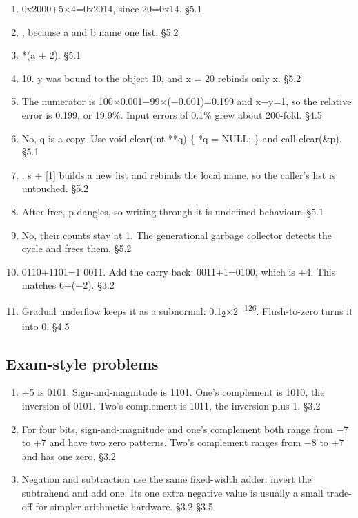 \documentclass[11pt]{article}
\begin{document}
\begin{keepsection}
\begin{enumerate}
\item 0x2000+5\ensuremath{\times}4=0x2014, since 20=0x14. \hfill{\small\color{FAUblue}§5.1}
\item [1, 2, 3], because a and b name one list. \hfill{\small\color{FAUblue}§5.2}
\item *(a + 2). \hfill{\small\color{FAUblue}§5.1}
\item 10. y was bound to the object 10, and x = 20 rebinds only x. \hfill{\small\color{FAUblue}§5.2}
\item The numerator is 100\ensuremath{\times}0.001\ensuremath{-}99\ensuremath{\times}(\ensuremath{-}0.001)=0.199 and x\ensuremath{-}y=1, so the relative error is 0.199, or 19.9\%. Input errors of 0.1\% grew about 200-fold. \hfill{\small\color{FAUblue}§4.5}
\item No, q is a copy. Use void clear(int **q) \{ *q = NULL; \} and call clear(\&p). \hfill{\small\color{FAUblue}§5.1}
\item [0]. s + [1] builds a new list and rebinds the local name, so the caller’s list is untouched. \hfill{\small\color{FAUblue}§5.2}
\item After free, p dangles, so writing through it is undefined behaviour. \hfill{\small\color{FAUblue}§5.1}
\item No, their counts stay at 1. The generational garbage collector detects the cycle and frees them. \hfill{\small\color{FAUblue}§5.2}
\item 0110+1101=1 0011. Add the carry back: 0011+1=0100, which is +4. This matches 6+(\ensuremath{-}2). \hfill{\small\color{FAUblue}§3.2}
\item Gradual underflow keeps it as a subnormal: 0.1\textsubscript{2}\ensuremath{\times}2\textsuperscript{\ensuremath{-}126}. Flush-to-zero turns it into 0. \hfill{\small\color{FAUblue}§4.5}
\end{enumerate}

\end{keepsection}
\begin{keepsection}\subsection{Exam-style problems}

\begin{enumerate}
\item +5 is 0101. Sign-and-magnitude is 1101. One’s complement is 1010, the inversion of 0101. Two’s complement is 1011, the inversion plus 1. \hfill{\small\color{FAUblue}§3.2}
\item For four bits, sign-and-magnitude and one’s complement both range from \ensuremath{-}7 to +7 and have two zero patterns. Two’s complement ranges from \ensuremath{-}8 to +7 and has one zero. \hfill{\small\color{FAUblue}§3.2}
\item Negation and subtraction use the same fixed-width adder: invert the subtrahend and add one. Its one extra negative value is usually a small trade-off for simpler arithmetic hardware. \hfill{\small\color{FAUblue}§3.2} \hfill{\small\color{FAUblue}§3.5}
\end{enumerate}

\end{keepsection}
\end{document}
